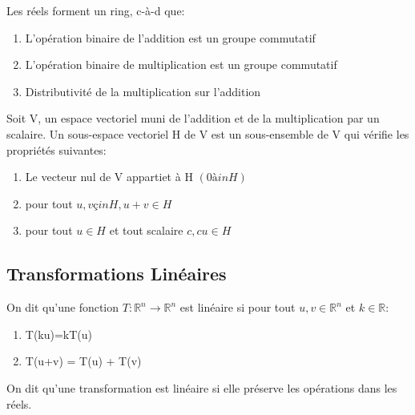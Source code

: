 \documentclass{article}
\begin{document}
\begin{remark}
    Les réels forment un ring, c-à-d que:
    \begin{enumerate}
	\item L'opération binaire de l'addition est un groupe commutatif
	\item L'opération binaire de multiplication est un groupe commutatif
	\item Distributivité de la multiplication sur l'addition
    \end{enumerate}
\end{remark}

\begin{definition}
    Soit V, un espace vectoriel muni de l'addition et de la multiplication
    par un scalaire. Un sous-espace vectoriel H de V est un sous-ensemble de
    V qui vérifie les propriétés suivantes:
    \begin{enumerate}
	\item Le vecteur nul de V appartiet à H $(0 àin H)$
	\item pour tout $u,v çin H, u+v \in H$
	\item pour tout $u \in H$ et tout scalaire $c, cu \in H$
    \end{enumerate}
\end{definition}

\subsection{Transformations Linéaires}

\begin{definition}
    On dit qu'une fonction $T: \mathbb{R}^n \rightarrow \mathbb{R}^n$
    est linéaire si pour tout $u,v \in \mathbb{R}^n$ et $k \in \mathbb{R}$:
    \begin{enumerate}
	\item T(ku)=kT(u)
	\item T(u+v) = T(u) + T(v)
    \end{enumerate}
\end{definition}

\begin{intuition}
    On dit qu'une transformation est linéaire si elle préserve les
    opérations dans les réels.
\end{intuition}

\begin{remark}
\end{remark}
\end{document}
